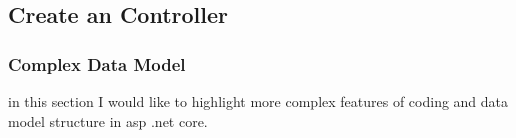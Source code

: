\documentclass{scrartcl}
\begin{document}
\noindent%
\begin{minipage}{\linewidth}%
\end{minipage}


\subsection{Create an Controller}



















\subsubsection{Complex Data Model}
in this section I would like to highlight more complex features of coding and data model structure in asp .net core.\\
\end{document}
